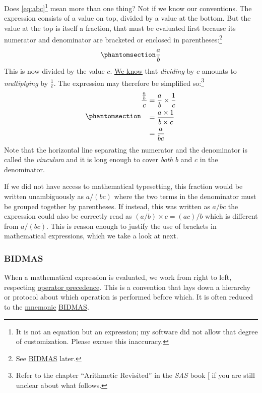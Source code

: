 \documentclass[
  a4paper,
]{article}
\begin{document}
Does \cref{eq:abc}\footnote{It is not an equation but an expression; my
  software did not allow that degree of customization. Please excuse
  this inaccuracy.} mean more than one thing? Not if we know our
conventions. The expression consists of a value on top, divided by a
value at the bottom. But the value at the top is itself a fraction, that
must be evaluated first because its numerator and denominator are
bracketed or enclosed in parentheses:\footnote{See
  \hyperref[bidmas]{BIDMAS} later.}
\begin{equation}\phantomsection\label{eq:a-over-b}{
\frac{a}{b}
}\end{equation} This is now divided by the value \(c\).
\href{https://swanlotus.netlify.app/blogs/the-two-most-important-numbers-zero-and-one\#the-multiplicative-inverse-in-mathbbz-mathbbq-and-mathbbr}{We
know} that \emph{dividing} by \(c\) amounts to \emph{multiplying} by
\(\frac{1}{c}\). The expression may therefore be simplified
so:\footnote{Refer to the chapter ``Arithmetic Revisited'' in the
  \emph{SAS} book {[}\citeproc{ref-sas}{1}{]} if you are still unclear
  about what follows.}
\begin{equation}\phantomsection\label{eq:simplified}{
\begin{aligned}
\frac{\frac{a}{b}}{c} &= \frac{a}{b} \times \frac{1}{c}\\
&= \frac{a \times 1}{b \times c}\\
&= \frac{a}{bc}
\end{aligned}
}\end{equation} Note that the horizontal line separating the numerator
and the denominator is called the \emph{vinculum} and it is long enough
to cover \emph{both} \(b\) and \(c\) in the denominator.

If we did not have access to mathematical typesetting, this fraction
would be written unambiguously as \(a/(bc)\) where the two terms in the
denominator must be grouped together by parentheses. If instead, this
was written as \(a/bc\) the expression could also be correctly read as
\((a/b) \times c = (ac)/b\) which is different from \(a/(bc)\). This is
reason enough to justify the use of brackets in mathematical
expressions, which we take a look at next.

\subsubsection{BIDMAS}\label{bidmas}

When a mathematical expression is evaluated, we work from right to left,
respecting
\href{https://en.wikipedia.org/wiki/Order_of_operations}{operator
precedence}. This is a convention that lays down a hierarchy or protocol
about which operation is performed before which. It is often reduced to
the \href{https://www.dictionary.com/browse/mnemonic}{mnemonic}
\href{https://en.wikipedia.org/wiki/Order_of_operations\#Mnemonics}{BIDMAS}.
\end{document}

